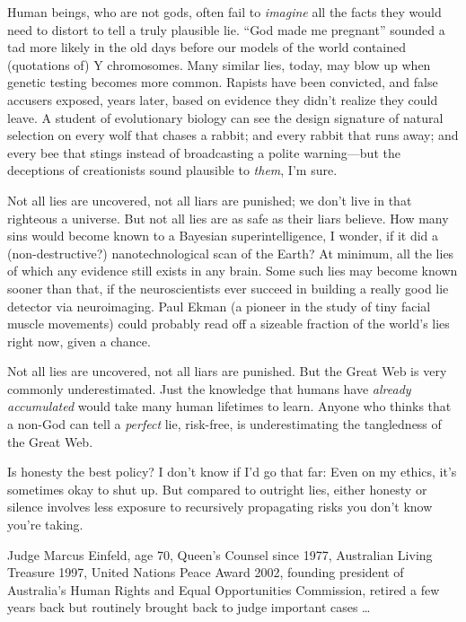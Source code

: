{
 Human beings, who are not gods, often fail to \textit{imagine} all
the facts they would need to distort to tell a truly plausible lie.
``God made me pregnant'' sounded a
tad more likely in the old days before our models of the world
contained (quotations of) Y chromosomes. Many similar lies, today, may
blow up when genetic testing becomes more common. Rapists have been
convicted, and false accusers exposed, years later, based on evidence
they didn't realize they could leave. A student of
evolutionary biology can see the design signature of natural selection
on every wolf that chases a rabbit; and every rabbit that runs away;
and every bee that stings instead of broadcasting a polite
warning---but the deceptions of creationists sound plausible to
\textit{them}, I'm sure.}

{
 Not all lies are uncovered, not all liars are punished; we
don't live in that righteous a universe. But not all
lies are as safe as their liars believe. How many sins would become
known to a Bayesian superintelligence, I wonder, if it did a
(non-destructive?) nanotechnological scan of the Earth? At minimum, all
the lies of which any evidence still exists in any brain. Some such
lies may become known sooner than that, if the neuroscientists ever
succeed in building a really good lie detector via neuroimaging. Paul
Ekman (a pioneer in the study of tiny facial muscle movements) could
probably read off a sizeable fraction of the world's
lies right now, given a chance.}

{
 Not all lies are uncovered, not all liars are punished. But the
Great Web is very commonly underestimated. Just the knowledge that
humans have \textit{already accumulated} would take many human
lifetimes to learn. Anyone who thinks that a non-God can tell a
\textit{perfect} lie, risk-free, is underestimating the tangledness of
the Great Web.}

{
 Is honesty the best policy? I don't know if
I'd go that far: Even on my ethics,
it's sometimes okay to shut up. But compared to
outright lies, either honesty or silence involves less exposure to
recursively propagating risks you don't know
you're taking.}

\myendsectiontext


\bigskip


{
 Judge Marcus Einfeld, age 70, Queen's Counsel
since 1977, Australian Living Treasure 1997, United Nations Peace Award
2002, founding president of Australia's Human Rights
and Equal Opportunities Commission, retired a few years back but
routinely brought back to judge important cases \ldots }

